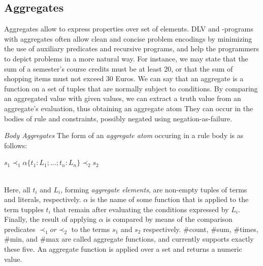 \documentclass[14pt,a4paper, titlepage]{article}
\begin{document}
\subsection{Aggregates}
Aggregates allow to express properties over set of elements. DLV and \hex{}-programs with aggregates often allow clean and concise problem encodings by minimizing the use of auxiliary predicates and recursive programs, and help the programmers to depict problems in a more natural way. For instance, we may state that the sum of a semester's course credits must be at least 20, or that the sum of shopping items must not exceed 30 Euros. We can say that an aggregate is a function on a set of tuples that are normally subject to conditions. By comparing an aggregated value with given values, we can extract a truth value from an aggregate's evaluation, thus obtaining an aggregate atom 
They can occur in the bodies of rule and constraints, possibly negated using negation-as-failure.

\emph{Body Aggregates} The form of an \emph{aggregate atom} occuring in a rule body is as follows:\\ \centerline{$s_1 \prec_1 \alpha \{ t_1:L_1;...;t_n:L_n\} \prec_2 s_2$} 
\\ Here, all $\mathit{t_i}$ and $\mathit{L_i}$, forming \emph{aggregate elements}, are non-empty tuples of terms and literals, respectively. $\alpha$ is the name of some function that is applied to the term tupples \texttt{$t_i$} that remain after evaluating the conditions expressed by $L_i$. Finally,  the result of applying $\alpha$ is compared by means of the comparison predicates $\prec_1 or \prec_2$ to the terms $s_1$ and $s_2$ respectively. \#count, \#sum, \#times, \#min, and \#max are called aggregate functions, and \dlvhex{} currently supports exactly these five. An aggregate function is applied over a set and returns a numeric value.
\end{document}
